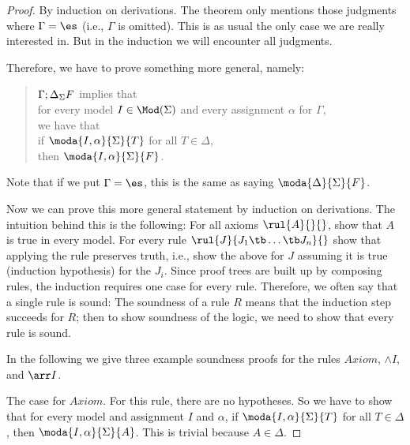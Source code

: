 \begin{proof}
By induction on derivations.
The theorem only mentions those judgments where $\Gamma=\es$ (i.e., $\Gamma$ is omitted). This is as usual the only case we are really interested in. But in the induction we will encounter all judgments.

Therefore, we have to prove something more general, namely:
\begin{quote}
$\Gamma;\Delta_\Sigma F$ implies that \\
 \tb for every model $I\in\Mod(\Sigma)$ and every assignment $\alpha$ for $\Gamma$, \\
 \tb we have that\\
 \tb\tb if $\moda{I,\alpha}{\Sigma}{T}$ for all $T\in\Delta$,\\
 \tb\tb then $\moda{I,\alpha}{\Sigma}{F}$.
\end{quote}
Note that if we put $\Gamma=\es$, this is the same as saying $\moda{\Delta}{\Sigma}{F}$.

Now we can prove this more general statement by induction on derivations. The intuition behind this is the following: For all axioms $\rul{\der A}{}{}$, show that $A$ is true in every model. For every rule $\rul{J}{J_1\tb\ldots\tb J_n}{}$ show that applying the rule preserves truth, i.e., show the above for $J$ assuming it is true (induction hypothesis) for the $J_i$.
Since proof trees are built up by composing rules, the induction requires one case for every rule. Therefore, we often say that a single rule is sound: The soundness of a rule $R$ means that the induction step succeeds for $R$; then to show soundness of the logic, we need to show that every rule is sound.

In the following we give three example soundness proofs for the rules $Axiom$, $\wedge I$, and $\arr I$.
\medskip

\noindent The case for $Axiom$. For this rule, there are no hypotheses. So we have to show that for every model and assignment $I$ and $\alpha$, if $\moda{I,\alpha}{\Sigma}{T}$ for all $T\in\Delta$, then $\moda{I,\alpha}{\Sigma}{A}$. This is trivial because $A\in\Delta$.
\medskip


\end{proof}
